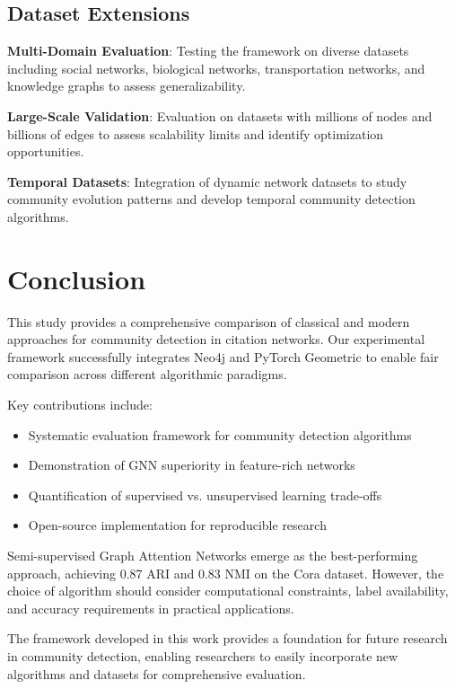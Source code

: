 \documentclass[conference]{IEEEtran}
\begin{document}
\subsection{Dataset Extensions}

\textbf{Multi-Domain Evaluation}: Testing the framework on diverse datasets including social networks, biological networks, transportation networks, and knowledge graphs to assess generalizability.

\textbf{Large-Scale Validation}: Evaluation on datasets with millions of nodes and billions of edges to assess scalability limits and identify optimization opportunities.

\textbf{Temporal Datasets}: Integration of dynamic network datasets to study community evolution patterns and develop temporal community detection algorithms.

\section{Conclusion}

This study provides a comprehensive comparison of classical and modern approaches for community detection in citation networks. Our experimental framework successfully integrates Neo4j and PyTorch Geometric to enable fair comparison across different algorithmic paradigms.

Key contributions include:
\begin{itemize}
    \item Systematic evaluation framework for community detection algorithms
    \item Demonstration of GNN superiority in feature-rich networks
    \item Quantification of supervised vs. unsupervised learning trade-offs
    \item Open-source implementation for reproducible research
\end{itemize}

Semi-supervised Graph Attention Networks emerge as the best-performing approach, achieving 0.87 ARI and 0.83 NMI on the Cora dataset. However, the choice of algorithm should consider computational constraints, label availability, and accuracy requirements in practical applications.

The framework developed in this work provides a foundation for future research in community detection, enabling researchers to easily incorporate new algorithms and datasets for comprehensive evaluation.
\end{document}
